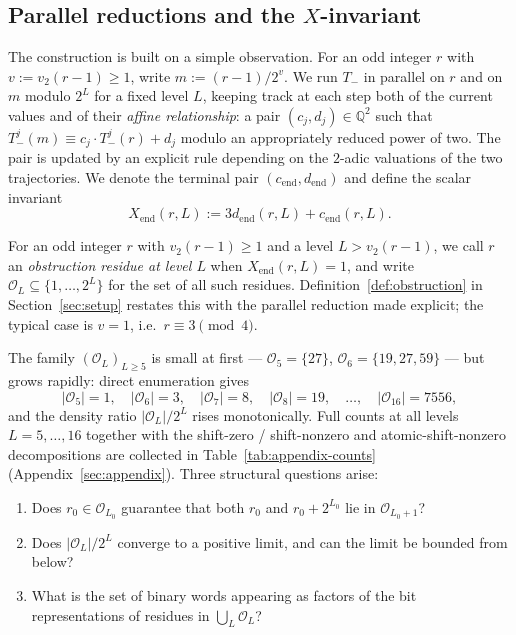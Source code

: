 \documentclass[11pt,reqno]{amsart}
\theoremstyle{plain}
\theoremstyle{definition}
\theoremstyle{remark}
\newcommand{\Tminus}{T_{-}}
\newcommand{\Q}{\mathbb{Q}}
\newcommand{\Obs}{\mathcal{O}}
\newcommand{\Xend}{X_{\mathrm{end}}}
\newcommand{\cend}{c_{\mathrm{end}}}
\newcommand{\dend}{d_{\mathrm{end}}}
\newcommand{\vtwo}{v_{2}}
\begin{document}
\subsection{Parallel reductions and the \texorpdfstring{$X$}{X}-invariant}

The construction is built on a simple observation. For an odd integer $r$
with $v := \vtwo(r-1) \ge 1$, write $m := (r-1)/2^v$. We run
$\Tminus$ in parallel on $r$ and on $m$ modulo $2^L$ for a fixed level $L$,
keeping track at each step both of the current values and of their
\emph{affine relationship}: a pair $(c_j, d_j) \in \Q^2$ such that
$\Tminus^j(m) \equiv c_j \cdot \Tminus^j(r) + d_j$ modulo an
appropriately reduced power of two. The pair is updated by an explicit rule
depending on the $2$-adic valuations of the two trajectories. We denote the
terminal pair $(\cend, \dend)$ and define the scalar invariant
\[
\Xend(r, L) := 3 \dend(r, L) + \cend(r, L).
\]

For an odd integer $r$ with $\vtwo(r-1) \ge 1$ and a level $L > \vtwo(r-1)$,
we call $r$ an \emph{obstruction residue at level $L$} when
$\Xend(r, L) = 1$, and write $\Obs_L \subseteq \{1, \ldots, 2^L\}$ for
the set of all such residues. Definition~\ref{def:obstruction} in
Section~\ref{sec:setup} restates this with the parallel reduction made
explicit; the typical case is $v = 1$, i.e.\ $r \equiv 3 \pmod 4$.

The family $(\Obs_L)_{L \ge 5}$ is small at first --- $\Obs_5 = \{27\}$,
$\Obs_6 = \{19, 27, 59\}$ --- but grows rapidly: direct enumeration gives
\[
|\Obs_5| = 1, \quad |\Obs_6| = 3, \quad |\Obs_7| = 8, \quad |\Obs_8| = 19, \quad \ldots, \quad |\Obs_{16}| = 7556,
\]
and the density ratio $|\Obs_L|/2^L$ rises monotonically. Full counts at
all levels $L = 5, \ldots, 16$ together with the shift-zero / shift-nonzero
and atomic-shift-nonzero decompositions are collected in
Table~\ref{tab:appendix-counts} (Appendix~\ref{sec:appendix}). Three structural
questions arise:

\begin{enumerate}[label=(Q\arabic*)]
\item Does $r_0 \in \Obs_{L_0}$ guarantee that both $r_0$ and $r_0 + 2^{L_0}$
  lie in $\Obs_{L_0+1}$?
\item Does $|\Obs_L|/2^L$ converge to a positive limit, and can the limit
  be bounded from below?
\item What is the set of binary words appearing as factors of the bit
  representations of residues in $\bigcup_L \Obs_L$?
\end{enumerate}
\end{document}
